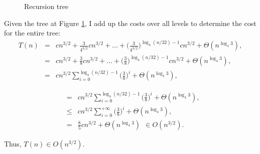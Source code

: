 \documentclass{article}
\begin{document}
\begin{figure}[h]
\begin{center}
	\caption{Recursion tree} \label{recursion_tree}
	\end{center}
	
	\end{figure}
	
	\noindent Given the tree at Figure \ref{recursion_tree}, I add up the costs over all levels to determine the cost for the entire tree:
	\begin{eqnarray}
	\nonumber
	T(n) &=& cn^{3/2} + \frac{3}{4^{3/2}} cn^{3/2} + ... + \Bigg( \frac{3}{4^{3/2}} \Bigg)^{\log_4 (n/32)-1} cn^{3/2} + \Theta(n^{\log_4 3}),\\
	\nonumber
	&=& cn^{3/2} + \frac{3}{8} cn^{3/2} + ... + \Bigg( \frac{3}{8} \Bigg)^{\log_4 (n/32)-1} cn^{3/2} + \Theta(n^{\log_4 3}), \\ 
	\nonumber
	&=& cn^{3/2} \sum_{i=0}^{\log_4 (n/32)-1} \Bigg( \frac{3}{8} \Bigg)^i + \Theta(n^{\log_4 3}), 
	\nonumber
	\end{eqnarray}
	
	\begin{eqnarray}
	\nonumber
	&=& cn^{3/2} \sum_{i=0}^{\log_4 (n/32)-1} \Bigg( \frac{3}{8} \Bigg)^i + \Theta(n^{\log_4 3}), \\
	\nonumber
	&\leq &   cn^{3/2} \sum_{i=0}^{+\infty} \Bigg( \frac{3}{8} \Bigg)^i + \Theta(n^{\log_4 3}), \\
	\nonumber
	 & = &   \frac{8}{5} cn^{3/2} + \Theta(n^{\log_4 3}) ~ ~ \in O(n^{3/2}) .
	\end{eqnarray}
	
	Thus, $ T(n) \in O(n^{3/2}) $. 
	
\end{document}
